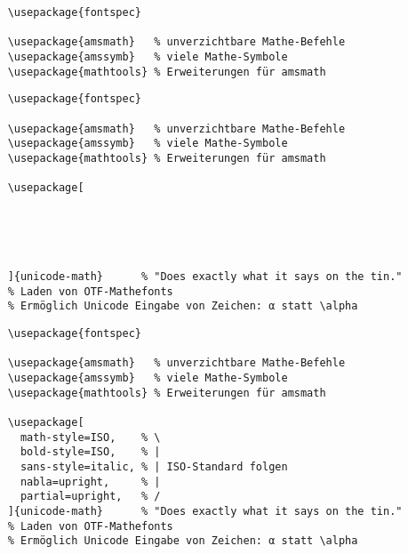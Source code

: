 \newsavebox{\mathfontsone}
\newsavebox{\mathfontstwo}
\newsavebox{\mathfontsthree}
\newsavebox{\mathfontsfour}

\begin{lrbox}{\mathfontsone}
  \begin{lstlisting}
    \usepackage{fontspec}

    \usepackage{amsmath}   % unverzichtbare Mathe-Befehle
    \usepackage{amssymb}   % viele Mathe-Symbole
    \usepackage{mathtools} % Erweiterungen für amsmath
  \end{lstlisting}
\end{lrbox}

\begin{lrbox}{\mathfontstwo}
  \begin{lstlisting}
    \usepackage{fontspec}

    \usepackage{amsmath}   % unverzichtbare Mathe-Befehle
    \usepackage{amssymb}   % viele Mathe-Symbole
    \usepackage{mathtools} % Erweiterungen für amsmath

    \usepackage[





    ]{unicode-math}      % "Does exactly what it says on the tin."
    % Laden von OTF-Mathefonts
    % Ermöglich Unicode Eingabe von Zeichen: α statt \alpha
  \end{lstlisting}
\end{lrbox}

\begin{lrbox}{\mathfontsthree}
  \begin{lstlisting}
    \usepackage{fontspec}

    \usepackage{amsmath}   % unverzichtbare Mathe-Befehle
    \usepackage{amssymb}   % viele Mathe-Symbole
    \usepackage{mathtools} % Erweiterungen für amsmath

    \usepackage[
      math-style=ISO,    % \
      bold-style=ISO,    % |
      sans-style=italic, % | ISO-Standard folgen
      nabla=upright,     % |
      partial=upright,   % /
    ]{unicode-math}      % "Does exactly what it says on the tin."
    % Laden von OTF-Mathefonts
    % Ermöglich Unicode Eingabe von Zeichen: α statt \alpha
  \end{lstlisting}
\end{lrbox}

